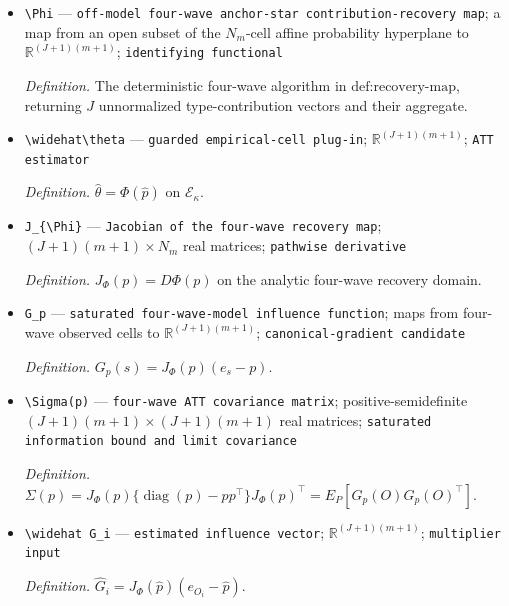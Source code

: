 \documentclass{article}
\begin{document}
\begin{itemize}
  \par\smallskip\noindent\emph{Definition.} The fixed coordinates of \(\theta_J\) reported jointly.
  \item \texttt{\textbackslash{}\allowbreak{}Phi} --- \texttt{off-\allowbreak{}model four-\allowbreak{}wave anchor-\allowbreak{}star contribution-\allowbreak{}recovery map}; a map from an open subset of the \(N_m\)-cell affine probability hyperplane to \(\mathbb R^{(J+1)(m+1)}\); \texttt{identifying functional}
  \par\smallskip\noindent\emph{Definition.} The deterministic four-wave algorithm in \(\text{def:recovery-map}\), returning \(J\) unnormalized type-contribution vectors and their aggregate.
  \item \texttt{\textbackslash{}\allowbreak{}widehat\textbackslash{}\allowbreak{}theta} --- \texttt{guarded empirical-\allowbreak{}cell plug-\allowbreak{}in}; \(\mathbb R^{(J+1)(m+1)}\); \texttt{ATT estimator}
  \par\smallskip\noindent\emph{Definition.} \(\widehat\theta=\Phi(\widehat p)\) on \(\mathcal E_\kappa\).
  \item \texttt{J\_\allowbreak{}\{\textbackslash{}\allowbreak{}Phi\}\allowbreak{}} --- \texttt{Jacobian of the four-\allowbreak{}wave recovery map}; \((J+1)(m+1)\times N_m\) real matrices; \texttt{pathwise derivative}
  \par\smallskip\noindent\emph{Definition.} \(J_{\Phi}(p)=D\Phi(p)\) on the analytic four-wave recovery domain.
  \item \texttt{G\_\allowbreak{}p} --- \texttt{saturated four-\allowbreak{}wave-\allowbreak{}model influence function}; maps from four-wave observed cells to \(\mathbb R^{(J+1)(m+1)}\); \texttt{canonical-\allowbreak{}gradient candidate}
  \par\smallskip\noindent\emph{Definition.} \(G_p(s)=J_{\Phi}(p)(e_s-p)\).
  \item \texttt{\textbackslash{}\allowbreak{}Sigma(p)} --- \texttt{four-\allowbreak{}wave ATT covariance matrix}; positive-semidefinite \((J+1)(m+1)\times(J+1)(m+1)\) real matrices; \texttt{saturated information bound and limit covariance}
  \par\smallskip\noindent\emph{Definition.} \(\Sigma(p)=J_{\Phi}(p)\{\operatorname{diag}(p)-pp^\top\}J_{\Phi}(p)^\top=E_P[G_p(O)G_p(O)^\top]\).
  \item \texttt{\textbackslash{}\allowbreak{}widehat G\_\allowbreak{}i} --- \texttt{estimated influence vector}; \(\mathbb R^{(J+1)(m+1)}\); \texttt{multiplier input}
  \par\smallskip\noindent\emph{Definition.} \(\widehat G_i=J_{\Phi}(\widehat p)(e_{O_i}-\widehat p)\).

\end{itemize}
\end{document}
